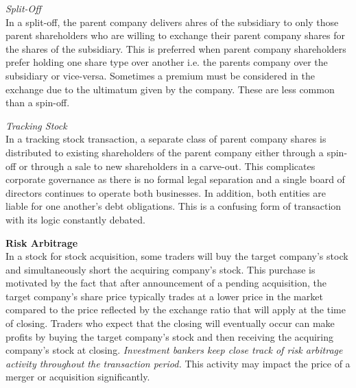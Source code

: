 \documentclass[10pt, a4paper]{article}
\begin{document}
\vspace{10pt}
\noindent \textit{Split-Off}\\
In a split-off, the parent company delivers ahres of the subsidiary to only those parent shareholders who are willing to exchange their parent company shares for the shares of the subsidiary. This is preferred when parent company shareholders prefer holding one share type over another i.e. the parents company over the subsidiary or vice-versa. Sometimes a premium must be considered in the exchange due to the ultimatum given by the company. These are less common than a spin-off.

\vspace{10pt}
\noindent \textit{Tracking Stock}\\
In a tracking stock transaction, a separate class of parent company shares is distributed to existing shareholders of the parent company either through a spin-off or through a sale to new shareholders in a carve-out. This complicates corporate governance as there is no formal legal separation and a single board of directors continues to operate both businesses. In addition, both entities are liable for one another's debt obligations. This is a confusing form of transaction with its logic constantly debated.

\vspace{10pt}
\noindent \textbf{Risk Arbitrage}\\
In a stock for stock acquisition, some traders will buy the target company's stock and simultaneously short the acquiring company's stock. This purchase is motivated by the fact that after announcement of a pending acquisition, the target company's share price typically trades at a lower price in the market compared to the price reflected by the exchange ratio that will apply at the time of closing. Traders who expect that the closing will eventually occur can make profits by buying the target company's stock and then receiving the acquiring company's stock at closing. \textit{Investment bankers keep close track of risk arbitrage activity throughout the transaction period.} This activity may impact the price of a merger or acquisition significantly. 
\end{document}
